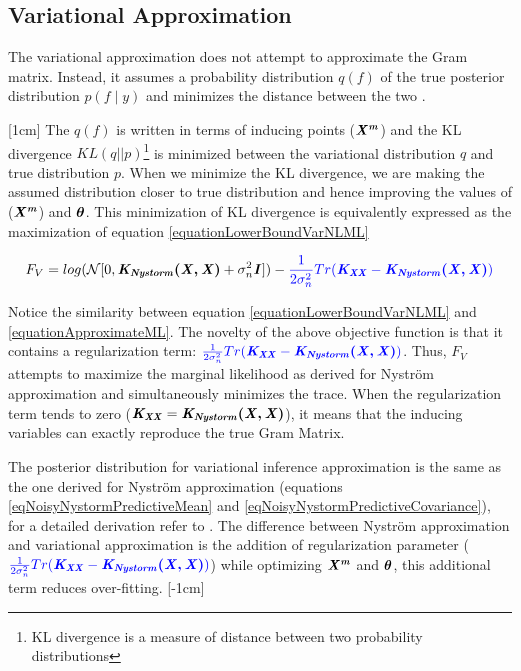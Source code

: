 \subsection{Variational Approximation}\label{subSecVariationalApprox} 
The variational approximation does not attempt to approximate the Gram matrix. Instead, it assumes a probability distribution $q(f)$ of the true posterior distribution $p(f \mid y)$ and minimizes the distance between the two \cite{Titsias09variationallearning}. 

[1cm]
The $q(f)$ is written in terms of inducing points ($\bm{\mathit{X^{m}}}$) and the KL divergence $KL(q||p)$\footnote{KL divergence is a measure of distance between two probability distributions} is minimized between the variational distribution $q$ and true distribution $p$. When we minimize the KL divergence, we are making the assumed distribution closer to true distribution and hence improving the values of ($\bm{\mathit{X^{m}}}$) and $\boldsymbol{\theta} $. This minimization of KL divergence is equivalently expressed as the maximization of equation \ref{equationLowerBoundVarNLML}

\begin{equation}\label{equationLowerBoundVarNLML}
F_{V} = log(\mathcal{N}[0, \bm{\mathit{K_{Nystorm}(X, X)}} + \sigma_{n}^{2}\bm{\mathit{I}} ]) - \textcolor{blue}{\frac{1}{2\sigma_{n}^{2}}Tr(\bm{\mathit{K_{XX}}} - \bm{\mathit{K_{Nystorm}(X, X)}})}
\end{equation}

Notice the similarity between equation \ref{equationLowerBoundVarNLML} and \ref{equationApproximateML}. The novelty of the above objective function is that it contains a regularization term: $\textcolor{blue}{\frac{1}{2\sigma_{n}^{2}}Tr(\bm{\mathit{K_{XX}}} - \bm{\mathit{K_{Nystorm}(X, X)}})}$. Thus, $F_{V}$ attempts to maximize the marginal likelihood as derived for Nystr\"{o}m approximation and simultaneously minimizes the trace. When the regularization term tends to zero ($\bm{\mathit{K_{XX}}} = \bm{\mathit{K_{Nystorm}(X, X)}}$), it means that the inducing variables can exactly reproduce the true Gram Matrix. 

\sloppy The posterior distribution for variational inference approximation is the same as the one derived for Nystr\"{o}m approximation (equations \ref{eqNoisyNystormPredictiveMean} and \ref{eqNoisyNystormPredictiveCovariance}), for a detailed derivation refer to \cite{Titsias09variationallearning}. The difference between Nystr\"{o}m approximation and variational approximation is the addition of regularization parameter ($\textcolor{blue}{\frac{1}{2\sigma_{n}^{2}}Tr(\bm{\mathit{K_{XX}}} - \bm{\mathit{K_{Nystorm}(X, X)}})}$) while optimizing $\bm{\mathit{X^{m}}}$ and $\boldsymbol{\theta}$, this additional term reduces over-fitting.
[-1cm]

